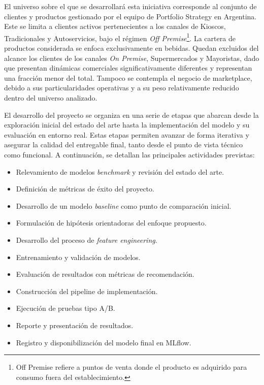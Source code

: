\documentclass[
11pt, %
]{charter}
\begin{document}
El universo sobre el que se desarrollará esta iniciativa corresponde al conjunto de clientes y productos gestionado por el equipo de Portfolio Strategy en Argentina. Este se limita a clientes activos pertenecientes a los canales de Kioscos, Tradicionales y Autoservicios, bajo el régimen \textit{Off Premise}\footnote{Off Premise refiere a puntos de venta donde el producto es adquirido para consumo fuera del establecimiento.}. La cartera de productos considerada se enfoca exclusivamente en bebidas. Quedan excluidos del alcance los clientes de los canales \textit{On Premise}, Supermercados y Mayoristas, dado que presentan dinámicas comerciales significativamente diferentes y representan una fracción menor del total. Tampoco se contempla el negocio de marketplace, debido a sus particularidades operativas y a su peso relativamente reducido dentro del universo analizado.

El desarrollo del proyecto se organiza en una serie de etapas que abarcan desde la exploración inicial del estado del arte hasta la implementación del modelo y su evaluación en entorno real. Estas etapas permiten avanzar de forma iterativa y asegurar la calidad del entregable final, tanto desde el punto de vista técnico como funcional. A continuación, se detallan las principales actividades previstas:

\begin{itemize}
\item Relevamiento de modelos \textit{benchmark} y revisión del estado del arte.
\item Definición de métricas de éxito del proyecto.
\item Desarrollo de un modelo \textit{baseline} como punto de comparación inicial.
\item Formulación de hipótesis orientadoras del enfoque propuesto.
\item Desarrollo del proceso de \textit{feature engineering}.
\item Entrenamiento y validación de modelos.
\item Evaluación de resultados con métricas de recomendación.
\item Construcción del pipeline de implementación.
\item Ejecución de pruebas tipo A/B.
\item Reporte y presentación de resultados.
\item Registro y disponibilización del modelo final en MLflow.
\end{itemize}
\end{document}

